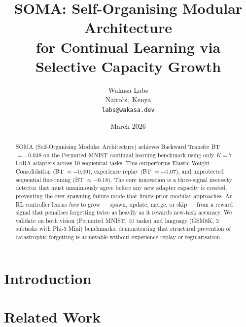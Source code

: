 \documentclass[11pt,a4paper]{article}
\title{%
    SOMA: Self-Organising Modular Architecture \\
    for Continual Learning via Selective Capacity Growth
}
\author{%
    Wakasa Labs \\
    Nairobi, Kenya \\
    \texttt{labs@wakasa.dev}
}
\date{March 2026}
\begin{document}
\maketitle

\begin{abstract}
SOMA (Self-Organising Modular Architecture) achieves Backward Transfer
BT $= -0.038$ on the Permuted MNIST continual learning benchmark using only
$K = 7$ LoRA adapters across 10 sequential tasks. This outperforms
Elastic Weight Consolidation (BT $\approx -0.09$), experience replay
(BT $\approx -0.07$), and unprotected sequential fine-tuning
(BT $\approx -0.18$). The core innovation is a three-signal necessity
detector that must unanimously agree before any new adapter capacity is
created, preventing the over-spawning failure mode that limits prior
modular approaches. An RL controller learns \emph{how} to grow ---
spawn, update, merge, or skip --- from a reward signal that penalises
forgetting twice as heavily as it rewards new-task accuracy. We validate
on both vision (Permuted MNIST, 10 tasks) and language (GSM8K, 3 subtasks
with Phi-3 Mini) benchmarks, demonstrating that structural prevention of
catastrophic forgetting is achievable without experience replay or
regularisation.
\end{abstract}

\section{Introduction}
\label{sec:intro}


\section{Related Work}
\label{sec:related}

\end{document}
